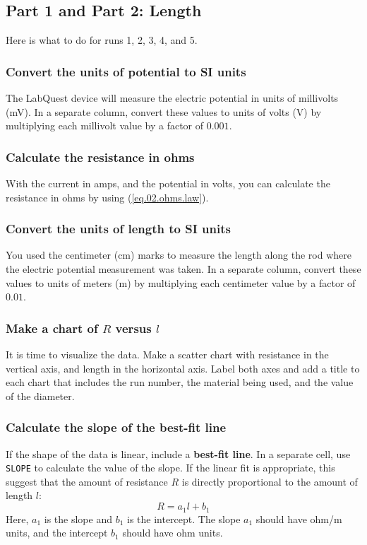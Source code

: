 \subsection{Part 1 and Part 2: Length}
%
Here is what to do for runs 1, 2, 3, 4, and 5.
%
\subsubsection{Convert the units of potential to SI units}
%
The LabQuest device will measure the electric potential in units of millivolts (mV). In a separate column, convert these values to units of volts (V) by multiplying each millivolt value by a factor of $0.001$.
%
\subsubsection{Calculate the resistance in ohms}
%
With the current in amps, and the potential in volts, you can calculate the resistance in ohms by using (\ref{eq.02.ohms.law}).
%
\subsubsection{Convert the units of length to SI units}
%
You used the centimeter (cm) marks to measure the length along the rod where the electric potential measurement was taken. In a separate column, convert these values to units of meters (m) by multiplying each centimeter value by a factor of $0.01$.
%
\subsubsection{Make a chart of $R$ versus $l$}
%
It is time to visualize the data. Make a scatter chart with resistance in the vertical axis, and length in the horizontal axis. Label both axes and add a title to each chart that includes the run number, the material being used, and the value of the diameter.
%
\subsubsection{Calculate the slope of the best-fit line}
%
If the shape of the data is linear, include a \textbf{best-fit line}. In a separate cell, use \texttt{SLOPE} to calculate the value of the slope. If the linear fit is appropriate, this suggest that the amount of resistance $R$ is directly proportional to the amount of length $l$:
\begin{equation}
	R = a_{1} l + b_{1}
\end{equation}
Here, $a_{1}$ is the slope and $b_{1}$ is the intercept. The slope $a_{1}$ should have ohm/m units, and the intercept $b_{1}$ should have ohm units.

